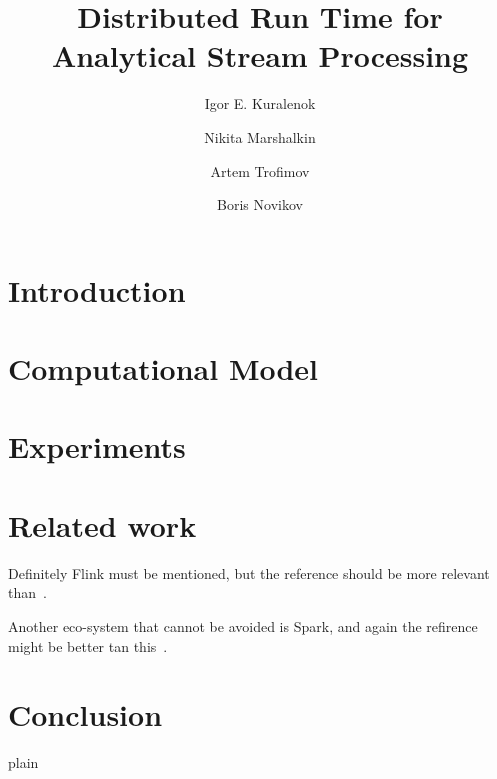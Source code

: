 \documentclass {article}
\begin{document}
\title {Distributed Run Time for Analytical Stream Processing}

\author {Igor E. Kuralenok \and Nikita Marshalkin \and Artem Trofimov \and Boris Novikov}
\maketitle

\begin{abstract}

\end {abstract}

\section {Introduction}

\section {Computational Model}

\section {Experiments}

\section {Related work}

Definitely Flink must be mentioned, but the reference should be more relevant than~\cite{Horvath:2017:CGS:3098572.3098579}.

Another eco-system that cannot be avoided is Spark, and again the refirence might be better tan this~\cite{Chen:2016:DRE:3006299.3006326}.


\section {Conclusion}

 {plain}

\end{document}
